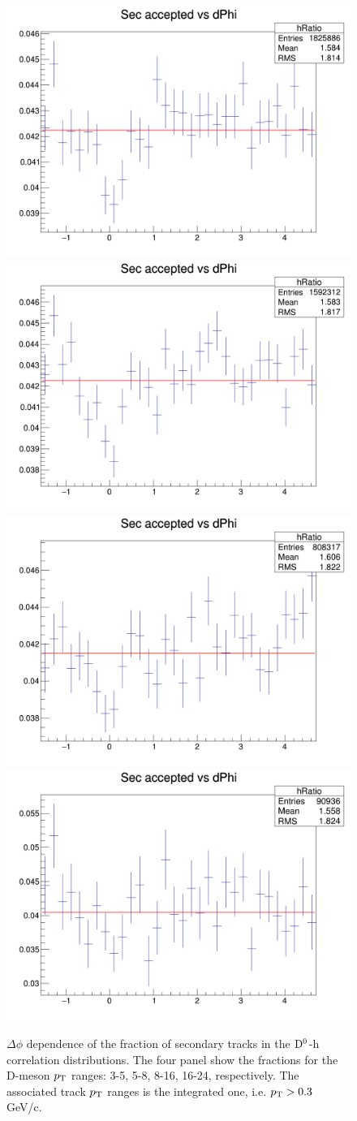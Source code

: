 \begin{figure}[h]   %
	\centering
	\includegraphics[width=.48\linewidth]{figures/SecTracks/DeltaPhi_3to5_03to99_RatioSecOverAll.png}
	\includegraphics[width=.48\linewidth]{figures/SecTracks/DeltaPhi_5to8_03to99_RatioSecOverAll.png}
    \includegraphics[width=.48\linewidth]{figures/SecTracks/DeltaPhi_8to16_03to99_RatioSecOverAll.png}
    \includegraphics[width=.48\linewidth]{figures/SecTracks/DeltaPhi_16to24_03to99_RatioSecOverAll.png}
	\caption{$\Delta\phi$ dependence of the fraction of secondary tracks in the ${\rm D^0}$-h correlation distributions. The four panel show the fractions for the D-meson $p_{\rm T}$ ranges: 3-5, 5-8, 8-16, 16-24, respectively. The associated track $p_{\rm T}$ ranges is the integrated one, i.e. $p_{\rm T} > 0.3$ GeV/c.}
	\label{fig:secdPhi}	
\end{figure}

